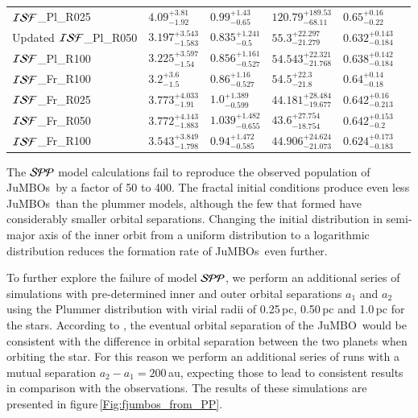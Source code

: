 \documentclass[aa]{lib/aa}
\newcommand{\jumbo}{\mbox{JuMBO}}
\newcommand{\jumbos}{\mbox{JuMBOs}}
\begin{document}
\begin{table}
\begin{tabular}{llllll}
${\cal ISF}$\_Pl\_R025 & $4.09^{+3.81}_{-1.92}$ & $0.99^{+1.43}_{-0.65}$ & $120.79^{+189.53}_{-68.11}$ & $0.65^{+0.16}_{-0.22}$ \\ Updated
${\cal ISF}$\_Pl\_R050 & $3.197^{+3.543}_{-1.583}$ & $0.835^{+1.241}_{-0.5}$ & $55.3^{+22.297}_{-21.279}$ & $0.632^{+0.143}_{-0.184}$ \\
${\cal ISF}$\_Pl\_R100 & $3.225^{+3.597}_{-1.54}$ & $0.856^{+1.161}_{-0.527}$ & $54.543^{+22.321}_{-21.768}$ & $0.638^{+0.142}_{-0.184}$ \\
  ${\cal ISF}$\_Fr\_R100  & $3.2^{+3.6}_{-1.5}$ & $0.86^{+1.16}_{-0.527}$ & $54.5^{+22.3}_{-21.8}$ & $0.64^{+0.14}_{-0.18}$ \\
${\cal ISF}$\_Fr\_R025 & $3.773^{+4.033}_{-1.91}$ & $1.0^{+1.389}_{-0.599}$ & $44.181^{+28.484}_{-19.677}$ & $0.642^{+0.16}_{-0.213}$ \\
${\cal ISF}$\_Fr\_R050 & $3.772^{+4.143}_{-1.883}$ & $1.039^{+1.482}_{-0.655}$ & $43.6^{+27.754}_{-18.754}$ & $0.642^{+0.153}_{-0.2}$ \\
${\cal ISF}$\_Fr\_R100 & $3.543^{+3.849}_{-1.798}$ & $0.94^{+1.472}_{-0.585}$ & $44.906^{+24.624}_{-21.073}$ & $0.624^{+0.173}_{-0.183}$ \\
 \end{tabular}
\end{table}

The ${\cal SPP}$ model calculations fail to reproduce the observed
population of \jumbos\, by a factor of 50 to 400.  The fractal initial
conditions produce even less \jumbos\, than the plummer models,
although the few that formed have considerably smaller orbital
separations.  Changing the initial distribution in semi-major axis of
the inner orbit from a uniform distribution to a logarithmic
distribution reduces the formation rate of \jumbos\, even further.

To further explore the failure of model ${\cal SPP}$, we perform an
additional series of simulations with pre-determined inner and outer
orbital separations $a_1$ and $a_2$ using the Plummer distribution
with virial radii of 0.25\,pc, 0.50\,pc and 1.0\,pc for the stars.
According to \cite{2023arXiv231006016W}, the eventual orbital
separation of the \jumbo\, would be consistent with the difference in
orbital separation between the two planets when orbiting the star. For
this reason we perform an additional series of runs with a mutual
separation $a_2-a_1 = 200$\,au, expecting those to lead to consistent
results in comparison with the observations.  The results of these
simulations are presented in figure\,\ref{Fig:fjumbos_from_PP}.
\end{document}
